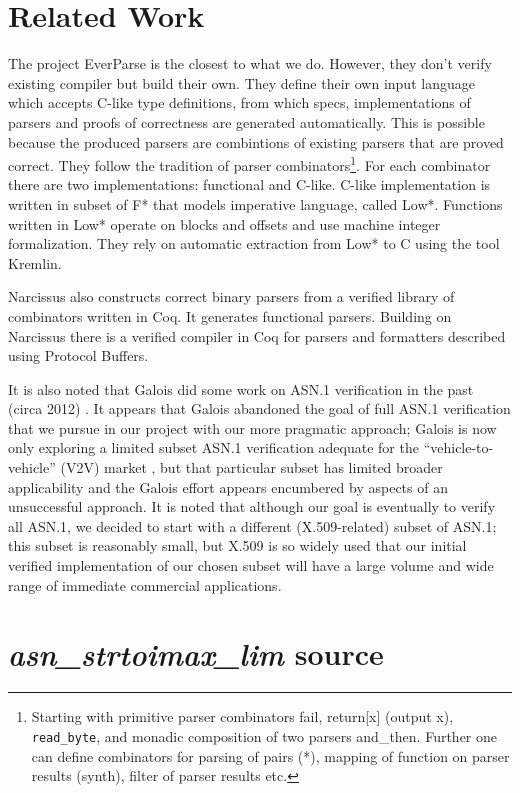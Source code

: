 \documentclass[acmsmall,nonacm]{acmart}
\begin{document}


\section{Related Work}

The project EverParse is the closest to what we do. However, they
don't verify existing compiler but build their own. They define their
own input language which accepts C-like type definitions, from which
specs, implementations of parsers and proofs of correctness are
generated automatically. This is possible because the produced parsers
are combintions of existing parsers that are proved correct. They
follow the tradition of parser combinators\footnote{Starting with
  primitive parser combinators fail, return[x] (output x),
  \texttt{read\_byte}, and monadic composition of two parsers
  and\_then. Further one can define combinators for parsing of pairs
  (*), mapping of function on parser results (synth), filter of parser
  results etc.}. For each combinator there are two implementations:
functional and C-like. C-like implementation is written in subset of
F* that models imperative language, called Low*. Functions written in
Low* operate on blocks and offsets and use machine integer
formalization. They rely on automatic extraction from Low* to C using
the tool Kremlin.

Narcissus also constructs correct binary parsers from a verified
library of combinators written in Coq. It generates functional
parsers. Building on Narcissus there is a verified compiler in Coq for
parsers and formatters described using Protocol Buffers.
 
It is also noted that Galois did some work on ASN.1 verification in
the past (circa 2012) \cite{TODO:11}. It appears that Galois abandoned
\cite{TODO:12} the goal of full ASN.1 verification that we pursue in
our project with our more pragmatic approach; Galois is now only
exploring a limited subset ASN.1 verification adequate for the
``vehicle-to-vehicle'' (V2V) market \cite{TODO:13}, but that
particular subset has limited broader applicability and the Galois
effort appears encumbered by aspects of an unsuccessful approach. It
is noted that although our goal is eventually to verify all ASN.1, we
decided to start with a different (X.509-related) subset of ASN.1;
this subset is reasonably small, but X.509 is so widely used that our
initial verified implementation of our chosen subset will have a large
volume and wide range of immediate commercial applications.


\appendix
\clearpage
\section{\emph{asn\_strtoimax\_lim} source}
\label{sec:stritomax}





\end{document}
